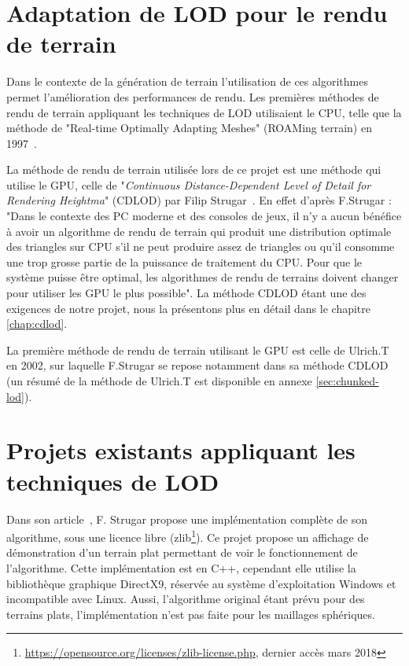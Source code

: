 \section*{Adaptation de LOD pour le rendu de terrain}

Dans le contexte de la génération de terrain l'utilisation de ces algorithmes permet l'amélioration des performances de rendu.
Les premières méthodes de rendu de terrain appliquant les techniques de LOD utilisaient le CPU, telle que la méthode de "Real-time Optimally Adapting Meshes" (ROAMing terrain) en 1997~\cite{ROAM}.

La méthode de rendu de terrain utilisée lors de ce projet est une méthode qui utilise le GPU, celle de "\emph{Continuous Distance-Dependent Level of Detail for Rendering Heightma}" (CDLOD) par Filip Strugar~\cite{CDLOD}. En effet d'après F.Strugar : "Dans le contexte des PC moderne et des consoles de jeux, il n'y a aucun bénéfice à avoir un algorithme de rendu de terrain qui produit une distribution optimale des triangles sur CPU s'il ne peut produire assez de triangles ou qu'il consomme une trop grosse partie de la puissance de traitement du CPU. Pour que le système puisse être optimal, les algorithmes de rendu de terrains doivent changer pour utiliser les GPU le plus possible". La méthode CDLOD étant une des exigences de notre projet, nous la présentons plus en détail dans le chapitre \ref{chap:cdlod}.

La première méthode de rendu de terrain utilisant le GPU est celle de Ulrich.T~\cite{CLOD} en 2002, sur laquelle F.Strugar se repose notamment dans sa méthode CDLOD (un résumé de la méthode de Ulrich.T est disponible en annexe \ref{sec:chunked-lod}).

\section*{Projets existants appliquant les techniques de LOD}\label{sec:lard-projets}

Dans son article~\cite{CDLOD}, F. Strugar propose une implémentation
complète de son algorithme, sous une licence libre
(zlib\footnote{\url{https://opensource.org/licenses/zlib-license.php},
dernier accès mars 2018}). Ce projet propose un affichage de
démonstration d'un terrain plat permettant de voir le fonctionnement de
l'algorithme. Cette implémentation est en C++, cependant elle utilise la
bibliothèque graphique DirectX9, réservée au système d'exploitation
Windows et incompatible avec Linux. Aussi, l'algorithme original étant
prévu pour des terrains plats, l'implémentation n'est pas faite pour les
maillages sphériques.

